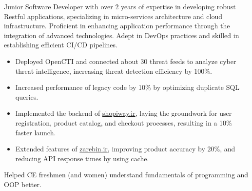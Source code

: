 \documentclass[10pt,a4paper,ragged2e,withhyper]{altacv}
\begin{document}
\begin{paracol}{2}
Junior Software Developer with over 2 years of expertise in developing robust Restful applications, specializing in micro-services architecture and cloud infrastructure. Proficient in enhancing application performance through the integration of advanced technologies. Adept in DevOps practices and skilled in establishing efficient CI/CD pipelines.



\begin{itemize}
\item Deployed OpenCTI and connected about 30 threat feeds to analyze cyber threat intelligence, increasing threat detection efficiency by 100\%.
\end{itemize}

\divider

\begin{itemize}
\item Increased performance of legacy code by 10\% by optimizing duplicate SQL queries.
\item Implemented the backend of \href{https://shopiway.ir}{shopiway.ir}, laying the groundwork for user registration, product catalog, and checkout processes, resulting in a 10\% faster launch.
\item Extended features of \href{https://zarebin.ir}{zarebin.ir}, improving product accuracy by 20\%, and reducing API response times by using cache.
\end{itemize}



Helped CE freshmen (and women) understand fundamentals of programming and OOP better.



\newpage


\switchcolumn



\end{paracol}
\end{document}
